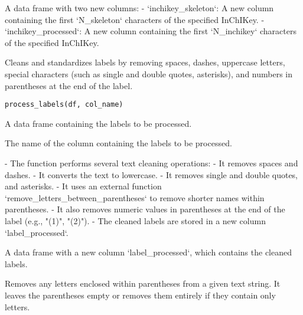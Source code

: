 \documentclass[a4paper]{book}
\begin{document}
%
\begin{Value}
A data frame with two new columns:
- `inchikey\_skeleton`: A new column containing the first `N\_skeleton` characters of the specified InChIKey.
- `inchikey\_processed`: A new column containing the first `N\_inchikey` characters of the specified InChIKey.
\end{Value}
%
\begin{Description}
Cleans and standardizes labels by removing spaces, dashes, uppercase letters,
special characters (such as single and double quotes, asterisks), and numbers in parentheses at the end of the label.
\end{Description}
%
\begin{Usage}
\begin{verbatim}
process_labels(df, col_name)
\end{verbatim}
\end{Usage}
%
\begin{Arguments}
\begin{ldescription}
\item[\code{df}] A data frame containing the labels to be processed.

\item[\code{col\_name}] The name of the column containing the labels to be processed.
\end{ldescription}
\end{Arguments}
%
\begin{Details}
- The function performs several text cleaning operations:
- It removes spaces and dashes.
- It converts the text to lowercase.
- It removes single and double quotes, and asterisks.
- It uses an external function `remove\_letters\_between\_parentheses` to remove shorter names within parentheses.
- It also removes numeric values in parentheses at the end of the label (e.g., "(1)", "(2)").
- The cleaned labels are stored in a new column `label\_processed`.
\end{Details}
%
\begin{Value}
A data frame with a new column `label\_processed`, which contains the cleaned labels.
\end{Value}
%
\begin{Description}
Removes any letters enclosed within parentheses from a given text string.
It leaves the parentheses empty or removes them entirely if they contain only letters.
\end{Description}
\end{document}
